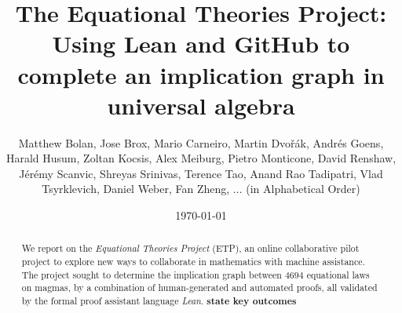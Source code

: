 \documentclass[12pt]{amsart}
\title[Equational Theories Project]{The Equational Theories Project: Using Lean and GitHub to complete an implication graph in universal algebra}
\author[Equational Theories Project contributors]{Matthew Bolan, Jose Brox, Mario Carneiro, Martin Dvo\v{r}\'ak, Andr\'es Goens, Harald Husum, Zoltan Kocsis, Alex Meiburg, Pietro Monticone, David Renshaw, J\'er\'emy Scanvic, Shreyas Srinivas, Terence Tao, Anand Rao Tadipatri, Vlad Tsyrklevich, Daniel Weber, Fan Zheng, ... (in Alphabetical Order)}
\date{\today}
\theoremstyle{definition}
\newcommand{\note}[1]{{\bf #1}}
\begin{document}
\begin{abstract}
  We report on the \emph{Equational Theories Project} (ETP), an online collaborative pilot project
  to explore new ways to collaborate in mathematics with machine assistance. The project sought to
  determine the implication graph between $4694$ equational laws on magmas, by a combination of
  human-generated and automated proofs, all validated by the formal proof assistant language
  \emph{Lean}. \note{state key outcomes}
\end{abstract}

\maketitle

\tableofcontents
















\appendix






\end{document}
